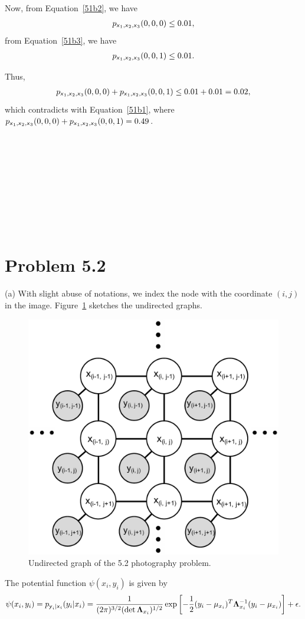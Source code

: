 \documentclass{article}
\newcommand{\s}[1]{\textsf{\textit{#1}}}
\newcommand{\qeds}{\hfill\qedsymbol}
\begin{document}
Now, from Equation~\eqref{51b2}, we have
\begin{align*}
	p_{\s{x}_1, \s{x}_2, \s{x}_3}(0, 0, 0) \leq 0.01,
\end{align*}
from Equation~\eqref{51b3}, we have
\begin{align*}
	p_{\s{x}_1, \s{x}_2, \s{x}_3}(0, 0, 1) \leq 0.01.
\end{align*}
%

Thus, 
\begin{align*}
	p_{\s{x}_1, \s{x}_2, \s{x}_3}(0, 0, 0) + p_{\s{x}_1, \s{x}_2, \s{x}_3}(0, 0, 1) \leq 0.01 + 0.01 = 0.02,
\end{align*}
%
which contradicts with Equation~\eqref{51b1}, where 
$p_{\s{x}_1, \s{x}_2, \s{x}_3}(0, 0, 0) + p_{\s{x}_1, \s{x}_2, \s{x}_3}(0, 0, 1) = 0.49$.
\qeds
\\
\\
\\
\\
\\
\\
\\
\\
\\
\\

\pagebreak
%
\section*{Problem 5.2}
(a) With slight abuse of notations, we index the node with the coordinate
$(i, j)$ in the image. Figure~\ref{f:52a} sketches the undirected graphs.
%
\begin{figure}[h]
  \centering
  \includegraphics[width=0.4\columnwidth]{52a.pdf}
    \vspace{-0.1cm}
  \caption{Undirected graph of the 5.2 photography problem.}
  \label{f:52a}
\end{figure}
%

The potential function $\psi(x_i, y_i)$ is given by
\begin{align*}
	\psi(x_i, y_i) = p_{\s{y}_i|\s{x}_i}(y_i|x_i)
	= \frac{1}{(2\pi)^{3/2}(\det {\bf\Lambda}_{x_i})^{1/2}}
	\exp\left[-\frac{1}{2}(y_i-\mu_{x_i})^T\mathbf{\Lambda}^{-1}_{x_i}(y_i - \mu_{x_i})\right] + \epsilon.
\end{align*}
\\
\end{document}
